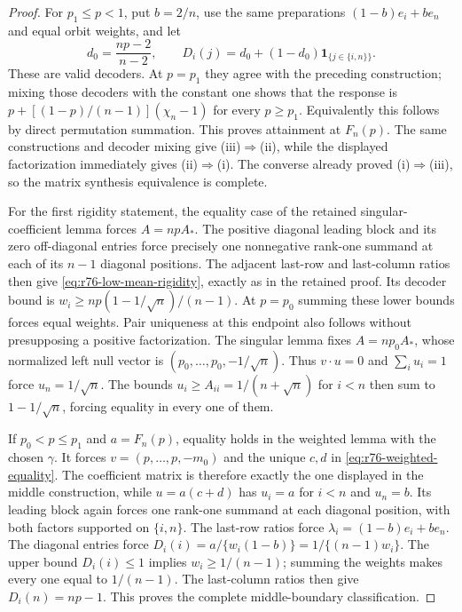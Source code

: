 \begin{proof}
For $p_1\le p<1$, put $b=2/n$, use the same preparations
$(1-b)e_i+b e_n$ and equal orbit weights, and let
\[
 d_0=\frac{np-2}{n-2},\qquad
 D_i(j)=d_0+(1-d_0)\mathbf1_{\{j\in\{i,n\}\}}.
\]
These are valid decoders. At $p=p_1$ they agree with the preceding
construction; mixing those decoders with the constant one shows that
the response is $p+[(1-p)/(n-1)](\chi_n-1)$ for every $p\ge p_1$.
Equivalently this follows by direct permutation summation. This proves
attainment at $F_n(p)$. The same
constructions and decoder mixing give (iii)$\Rightarrow$(ii), while
the displayed factorization immediately gives (ii)$\Rightarrow$(i).
The converse already proved (i)$\Rightarrow$(iii), so the matrix
synthesis equivalence is complete.

For the first rigidity statement, the equality case of the retained
singular-coefficient lemma forces $A=np A_*$. The positive diagonal
leading block and its zero off-diagonal entries force precisely one
nonnegative rank-one summand at each of its $n-1$ diagonal positions.
The adjacent last-row and last-column ratios then give
\eqref{eq:r76-low-mean-rigidity}, exactly as in the retained proof.
Its decoder bound is $w_i\ge np(1-1/\sqrt n)/(n-1)$.
At $p=p_0$ summing these lower bounds forces equal weights. Pair
uniqueness at this endpoint also follows without presupposing a positive
factorization. The singular lemma fixes $A=np_0 A_*$, whose normalized
left null vector is $(p_0,\ldots,p_0,-1/\sqrt n)$. Thus
$v\cdot u=0$ and $\sum_i u_i=1$ force $u_n=1/\sqrt n$.
The bounds $u_i\ge A_{ii}=1/(n+\sqrt n)$ for $i<n$ then sum to
$1-1/\sqrt n$, forcing equality in every one of them.

If $p_0<p\le p_1$ and $a=F_n(p)$, equality holds in the weighted
lemma with the chosen $\gamma$. It forces
$v=(p,\ldots,p,-m_0)$ and the unique $c,d$ in
\eqref{eq:r76-weighted-equality}. The coefficient matrix is therefore
exactly the one displayed in the middle construction, while
$u=a(c+d)$ has $u_i=a$ for $i<n$ and $u_n=b$. Its leading
block again forces one rank-one summand at each diagonal position, with
both factors supported on $\{i,n\}$. The last-row ratios force
$\lambda_i=(1-b)e_i+b e_n$. The diagonal entries force
$D_i(i)=a/\{w_i(1-b)\}=1/\{(n-1)w_i\}$.
The upper bound $D_i(i)\le1$ implies $w_i\ge1/(n-1)$;
summing the weights makes every one equal to $1/(n-1)$.
The last-column ratios then give $D_i(n)=np-1$.
This proves the complete middle-boundary classification.
\end{proof}

